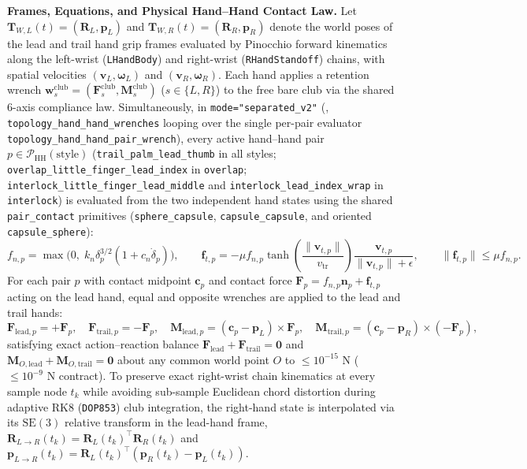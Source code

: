 \documentclass[11pt,a4paper]{article}
\begin{document}
\textbf{Frames, Equations, and Physical Hand--Hand Contact Law.} Let $\mathbf{T}_{W,L}(t) = (\mathbf{R}_L, \mathbf{p}_L)$ and $\mathbf{T}_{W,R}(t) = (\mathbf{R}_R, \mathbf{p}_R)$ denote the world poses of the lead and trail hand grip frames evaluated by Pinocchio forward kinematics along the left-wrist (\texttt{LHandBody}) and right-wrist (\texttt{RHandStandoff}) chains, with spatial velocities $(\mathbf{v}_L, \boldsymbol{\omega}_L)$ and $(\mathbf{v}_R, \boldsymbol{\omega}_R)$. Each hand applies a retention wrench $\mathbf{w}_s^{\mathrm{club}} = (\mathbf{F}_s^{\mathrm{club}}, \mathbf{M}_s^{\mathrm{club}})$ ($s \in \{L, R\}$) to the free bare club via the shared 6-axis compliance law. Simultaneously, in \texttt{mode="separated\_v2"} (, \texttt{topology\_hand\_hand\_wrenches} looping over the single per-pair evaluator \texttt{topology\_hand\_hand\_pair\_wrench}), every active hand--hand pair $p \in \mathcal{P}_{\mathrm{HH}}(\text{style})$ (\texttt{trail\_palm\_lead\_thumb} in all styles; \texttt{overlap\_little\_finger\_lead\_index} in \texttt{overlap}; \texttt{interlock\_little\_finger\_lead\_middle} and \texttt{interlock\_lead\_index\_wrap} in \texttt{interlock}) is evaluated from the two independent hand states using the shared \texttt{pair\_contact} primitives (\texttt{sphere\_capsule}, \texttt{capsule\_capsule}, and oriented \texttt{capsule\_sphere}):
\begin{equation}
f_{n,p} = \max\!\bigl(0,\; k_n \delta_p^{3/2}(1 + c_n \dot{\delta}_p)\bigr), \qquad
\mathbf{f}_{t,p} = -\mu f_{n,p}\tanh\!\left(\frac{\|\mathbf{v}_{t,p}\|}{v_{\mathrm{tr}}}\right)\frac{\mathbf{v}_{t,p}}{\|\mathbf{v}_{t,p}\| + \epsilon}, \qquad
\|\mathbf{f}_{t,p}\| \le \mu f_{n,p}.
\end{equation}
For each pair $p$ with contact midpoint $\mathbf{c}_p$ and contact force $\mathbf{F}_p = f_{n,p}\mathbf{n}_p + \mathbf{f}_{t,p}$ acting on the lead hand, equal and opposite wrenches are applied to the lead and trail hands:
\begin{equation}
\mathbf{F}_{\mathrm{lead},p} = +\mathbf{F}_p, \quad
\mathbf{F}_{\mathrm{trail},p} = -\mathbf{F}_p, \quad
\mathbf{M}_{\mathrm{lead},p} = (\mathbf{c}_p - \mathbf{p}_L) \times \mathbf{F}_p, \quad
\mathbf{M}_{\mathrm{trail},p} = (\mathbf{c}_p - \mathbf{p}_R) \times (-\mathbf{F}_p),
\end{equation}
satisfying exact action--reaction balance $\mathbf{F}_{\mathrm{lead}} + \mathbf{F}_{\mathrm{trail}} = \mathbf{0}$ and $\mathbf{M}_{O,\mathrm{lead}} + \mathbf{M}_{O,\mathrm{trail}} = \mathbf{0}$ about any common world point $O$ to $\le 10^{-15}\text{ N}$ ($\le 10^{-9}\text{ N}$ contract). To preserve exact right-wrist chain kinematics at every sample node $t_k$ while avoiding sub-sample Euclidean chord distortion during adaptive RK8 (\texttt{DOP853}) club integration, the right-hand state is interpolated via its $\mathrm{SE}(3)$ relative transform in the lead-hand frame, $\mathbf{R}_{L\to R}(t_k) = \mathbf{R}_L(t_k)^\top\mathbf{R}_R(t_k)$ and $\mathbf{p}_{L\to R}(t_k) = \mathbf{R}_L(t_k)^\top(\mathbf{p}_R(t_k) - \mathbf{p}_L(t_k))$.
\end{document}
